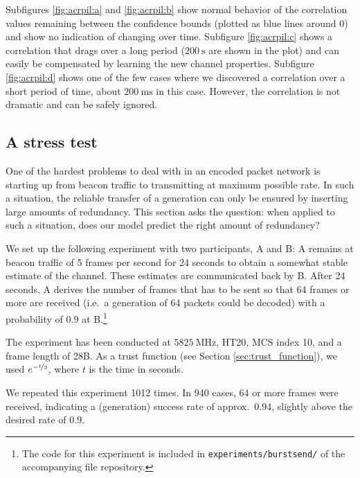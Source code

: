 \documentclass[10pt,a4paper]{article}
\begin{document}
Subfigures \ref{fig:acrpil:a} and \ref{fig:acrpil:b} show normal behavior of the correlation values remaining between the confidence bounds (plotted as blue lines around 0) and show no indication of changing over time.
Subfigure \ref{fig:acrpil:c} shows a correlation that drags over a long period ($\SI{200}{\second}$ are shown in the plot) and can easily be compensated by learning the new channel properties.
Subfigure \ref{fig:acrpil:d} shows one of the few cases where we discovered a correlation over a short period of time, about $\SI{200}{\milli\second}$ in this case.
However, the correlation is not dramatic and can be safely ignored.

\subsection{A stress test}
One of the hardest problems to deal with in an encoded packet network %
is starting up from beacon traffic to transmitting at maximum possible rate.
In such a situation, the reliable transfer of a generation can only be ensured by inserting large amounts of redundancy.
This section asks the question: when applied to such a situation, does our model predict the right amount of redundancy?

We set up the following experiment with two participants, A and B:
A remains at beacon traffic of 5 frames per second for 24 seconds to obtain a somewhat stable estimate of the channel.
These estimates are communicated back by B.
After 24 seconds, A derives the number of frames that has to be sent so that 64 frames or more are received (i.e.\ a generation of 64 packets could be decoded) with a probability of $0.9$ at B.\footnote{The code for this experiment is included in \texttt{experiments/burstsend/} of the accompanying file repository.}

The experiment has been conducted at $\SI{5825}{\mega\hertz}$, HT20, MCS index 10, and a frame length of 28B.
As a trust function (see Section \ref{sec:trust_function}), we used $e^{-\nicefrac{t}{3}}$, where $t$ is the time in seconds.

We repeated this experiment 1012 times.
In 940 cases, 64 or more frames were received, indicating a (generation) success rate of approx.\ $0.94$, slightly above the desired rate of $0.9$.
\end{document}
